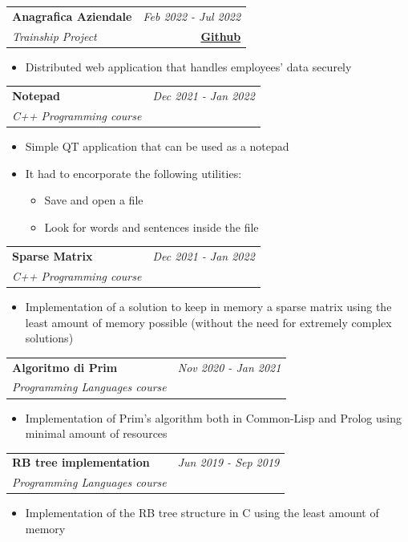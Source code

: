 \documentclass[a4paper,11pt]{article}
\makeatletter
\newcommand{\resumeProject}[4]{
\vspace{0.5mm}\item
    \begin{tabular*}{0.98\textwidth}[t]{l@{\extracolsep{\fill}}r}
        \textbf{#1} & \textit{\footnotesize{#3}} \\
        \footnotesize{\textit{#2}} & \footnotesize{#4}
    \end{tabular*}
    \vspace{-2.4mm}
}
\newcommand{\resumeItemListStart}{\begin{justify}\begin{itemize}[leftmargin=3ex, rightmargin=2ex, 
  noitemsep,labelsep=1.2mm,itemsep=0mm]\small}
\newcommand{\resumeItemListEnd}{\end{itemize}\end{justify}\vspace{-2mm}}
\makeatother
\begin{document}
    \resumeProject
      {Anagrafica Aziendale} %
      {Trainship Project} %
      {Feb 2022 - Jul 2022} %
      {\href{https://github.com/Andrea-Perego-99/Anagrafica-Aziendale}{\textbf{Github}}} %
      \resumeItemListStart
        \item {Distributed web application that handles employees' data securely}
      \resumeItemListEnd
    
     \vspace{-1mm}
     
    \resumeProject
      {Notepad} %
      {C++ Programming course} %
      {Dec 2021 - Jan 2022} %
      {
      } %
      \resumeItemListStart
        \item {Simple QT application that can be used as a notepad}
        \item {It had to encorporate the following utilities:
          \begin{itemize}
            \item Save and open a file
            \item Look for words and sentences inside the file
          \end{itemize}
        }
      \resumeItemListEnd

    \resumeProject
      {Sparse Matrix} %
      {C++ Programming course} %
      {Dec 2021 - Jan 2022} %
      {
      } %
      \resumeItemListStart
        \item {Implementation of a solution to keep in memory a sparse matrix using the least amount
        of memory possible (without the need for extremely complex solutions)}
      \resumeItemListEnd

    \resumeProject
      {Algoritmo di Prim} %
      {Programming Languages course} %
      {Nov 2020 - Jan 2021} %
      {
      } %
      \resumeItemListStart
        \item {Implementation of Prim's algorithm both in Common-Lisp and Prolog using minimal amount of
        resources}
      \resumeItemListEnd

    \resumeProject
      {RB tree implementation} %
      {Programming Languages course} %
      {Jun 2019 - Sep 2019} %
      {
      } %
      \resumeItemListStart
        \item {Implementation of the RB tree structure in C using the least amount of memory}
      \resumeItemListEnd
      
\end{document}
